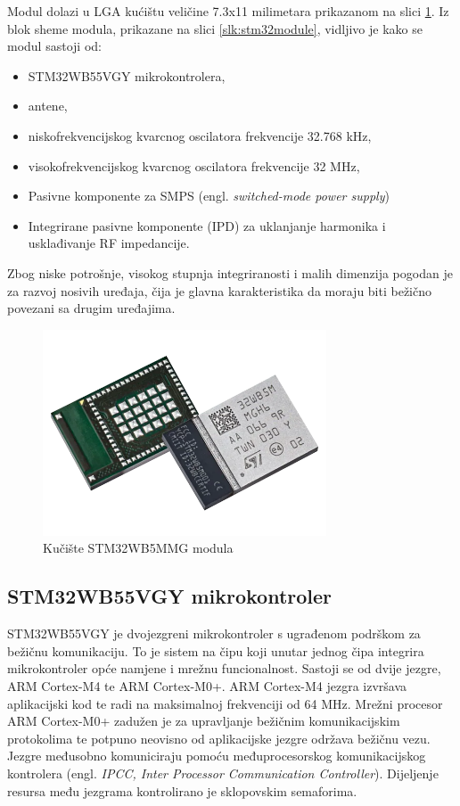 \documentclass[../diplomski_rad.tex]{subfiles}
\begin{document}
Modul dolazi u LGA kućištu veličine 7.3x11 milimetara prikazanom na slici \ref{slk:stm32module_kuciste}. 
Iz blok sheme modula, prikazane na slici \ref{slk:stm32module}, 
vidljivo je kako se modul sastoji od:
\begin{itemize}
    \item STM32WB55VGY mikrokontrolera,
    \item antene,
    \item niskofrekvencijskog kvarcnog oscilatora frekvencije 32.768 kHz,
    \item visokofrekvencijskog kvarcnog oscilatora frekvencije 32 MHz,
    \item Pasivne komponente za SMPS (engl. \textit{switched-mode power supply}) 
    \item Integrirane pasivne komponente (IPD) za uklanjanje harmonika i usklađivanje RF impedancije.     
  \end{itemize} 
Zbog niske potrošnje, visokog stupnja integriranosti i malih dimenzija pogodan je za razvoj nosivih uređaja, 
čija je glavna karakteristika da moraju biti bežično povezani sa drugim uređajima. 

\begin{figure}[htb]
    \centering
    \includegraphics[width=0.75\textwidth]{Figures/modul.png} 
    \caption{Kučište STM32WB5MMG modula \cite{modul_slika}}
    \label{slk:stm32module_kuciste}
\end{figure}

\subsection{STM32WB55VGY mikrokontroler}

STM32WB55VGY je dvojezgreni mikrokontroler s ugrađenom podrškom za bežičnu komunikaciju. 
To je sistem na čipu koji unutar jednog čipa integrira mikrokontroler opće namjene i mrežnu funcionalnost. 
Sastoji se od dvije jezgre, ARM Cortex-M4 te ARM Cortex-M0+.  
ARM Cortex-M4 jezgra izvršava aplikacijski kod te radi na maksimalnoj frekvenciji od 64 MHz. 
Mrežni procesor ARM Cortex-M0+ zadužen je za upravljanje bežičnim komunikacijskim protokolima 
te potpuno neovisno od aplikacijske jezgre održava bežičnu vezu.
Jezgre međusobno komuniciraju pomoću međuprocesorskog komunikacijskog kontrolera (engl. \textit{IPCC,  Inter Processor
Communication Controller}). 
Dijeljenje resursa među jezgrama kontrolirano je sklopovskim semaforima.
\end{document}
